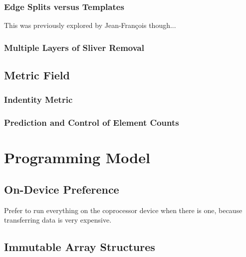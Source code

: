 \subsubsection{Edge Splits versus Templates}

This was previously explored by Jean-Fran\c{c}ois though...

\subsubsection{Multiple Layers of Sliver Removal}

\subsection{Metric Field}

\subsubsection{Indentity Metric}

\subsubsection{Prediction and Control of Element Counts}

\section{Programming Model}

\subsection{On-Device Preference}

Prefer to run everything on the coprocessor device
when there is one, because transferring data
is very expensive.

\subsection{Immutable Array Structures}

